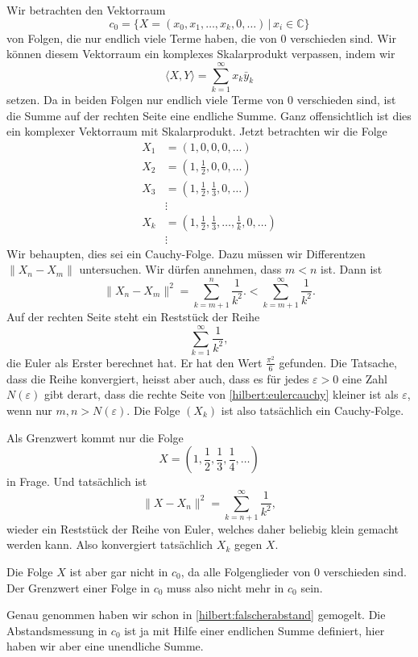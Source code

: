 \begin{beispiel}
Wir betrachten den Vektorraum
\[
c_0 = \{ X=(x_0, x_1, \dots ,x_k,0,\dots)\,|\, x_i \in \mathbb C\}
\]
von Folgen, die nur endlich viele Terme haben, die von $0$ verschieden sind.
Wir können diesem Vektorraum ein komplexes Skalarprodukt verpassen, indem wir
\[
\langle X,Y\rangle
=
\sum_{k=1}^\infty x_k\bar{y}_k
\]
setzen.
Da in beiden Folgen nur endlich viele Terme von $0$ verschieden sind, ist
die Summe auf der rechten Seite eine endliche Summe.
Ganz offensichtlich ist dies ein komplexer Vektorraum mit Skalarprodukt.
Jetzt betrachten wir die Folge
\begin{align*}
X_1 &= (1,0,0,0,\dots)
\\
X_2 &= \textstyle (1,\frac12,0,0,\dots)
\\
X_3 &= \textstyle (1,\frac12,\frac13,0,\dots)
\\
&\vdots
\\
X_k &= \textstyle (1,\frac12,\frac13,\dots,\frac1k,0,\dots)
\\
&\vdots
\end{align*}
Wir behaupten, dies sei ein Cauchy-Folge.
Dazu müssen wir Differentzen $\| X_n-X_m\|$ untersuchen.
Wir dürfen annehmen, dass $m < n$ ist.
Dann ist
\begin{equation}
\| X_n - X_m\|^2 = \sum_{k=m+1}^n \frac{1}{k^2}.
<
\sum_{k=m+1}^\infty \frac{1}{k^2}.
\label{hilbert:eulercauchy}
\end{equation}
Auf der rechten Seite steht ein Reststück der Reihe
\[
\sum_{k=1}^\infty \frac{1}{k^2},
\]
die Euler als Erster berechnet hat.
%
Er hat den Wert $\frac{\pi^2}{6}$ gefunden.
Die Tatsache, dass die Reihe konvergiert, heisst aber auch, dass
es für jedes $\varepsilon >0$ eine Zahl $N(\varepsilon)$ gibt derart,
dass die rechte Seite von \eqref{hilbert:eulercauchy} kleiner ist
als $\varepsilon$, wenn nur $m,n>N(\varepsilon)$.
Die Folge $(X_k)$ ist also tatsächlich ein Cauchy-Folge.

Als Grenzwert kommt nur die Folge 
\[
X = \textstyle (1,\frac12, \frac13,\frac14,\dots)
\]
in Frage.
Und tatsächlich ist
\begin{equation}
\|X-X_n\|^2
=
\sum_{k=n+1}^\infty \frac1{k^2},
\label{hilbert:falscherabstand}
\end{equation}
wieder ein Reststück der Reihe von Euler, welches daher beliebig klein
gemacht werden kann.
Also konvergiert tatsächlich $X_k$ gegen $X$.

Die Folge $X$ ist aber gar nicht in $c_0$,
da alle Folgenglieder von $0$ verschieden sind.
Der Grenzwert einer Folge in $c_0$ muss also nicht mehr in $c_0$ sein.

Genau genommen haben wir schon in \eqref{hilbert:falscherabstand}
gemogelt.
Die Abstandsmessung in $c_0$ ist ja mit Hilfe einer endlichen Summe
definiert, hier haben wir aber eine unendliche Summe.
\end{beispiel}

